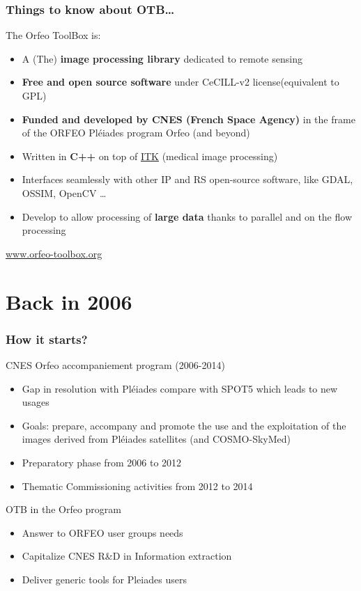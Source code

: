 \documentclass[8pt]{beamer}
\begin{document}
\begin{frame}
\frametitle{Things to know about OTB\ldots}
\begin{block}{The Orfeo ToolBox is:}
\begin{itemize}
\item A (The) \textbf{image processing library} dedicated to remote sensing
\item \textbf{Free and open source software} under CeCILL-v2 license(equivalent to GPL)
\item \textbf{Funded and developed by CNES (French Space Agency)} in the frame
  of the ORFEO Pléiades program Orfeo (and beyond)
\item Written in \textbf{C++} on top of \href{www.itk.org}{ITK} (medical image
  processing)
\item Interfaces seamlessly with other IP and RS open-source software, like GDAL, OSSIM, OpenCV \ldots
\item Develop to allow processing of \textbf{large data} thanks to parallel and on the flow processing
\end{itemize}
\end{block}

\begin{center}
{\huge\textcolor{red}{\url{www.orfeo-toolbox.org}}}
\end{center}

\end{frame}

\section{Back in 2006}

\begin{frame}
\frametitle{How it starts?}

\begin{block}{CNES Orfeo accompaniement program (2006-2014)}
\begin{itemize}
\item Gap in resolution with Pléiades compare with SPOT5 which leads to new usages
\item Goals: prepare, accompany and promote the use and the exploitation of the images derived from Pléiades satellites (and COSMO-SkyMed)
\item Preparatory phase from 2006 to 2012
\item Thematic Commissioning activities from 2012 to 2014
\end{itemize}
\end{block}

\begin{block}{OTB in the Orfeo program}
\begin{itemize}
\item Answer to ORFEO user groups needs
\item Capitalize CNES R\&D in Information extraction
\item Deliver generic tools for Pleiades users
\end{itemize}
\end{block}
\end{frame}
\end{document}

